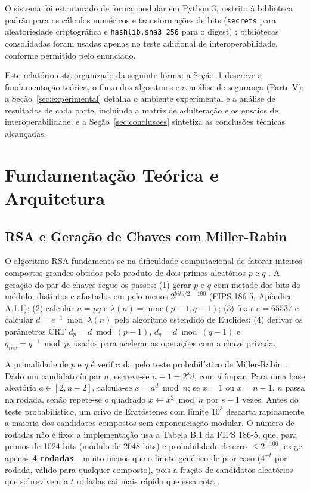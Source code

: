 \documentclass[conference]{IEEEtran}
\begin{document}
O sistema foi estruturado de forma modular em Python 3, restrito à
biblioteca padrão para os cálculos numéricos e transformações de bits
(\texttt{secrets} para aleatoriedade criptográfica e
\texttt{hashlib.sha3\_256} para o digest) \cite{fips202}; bibliotecas
consolidadas foram usadas apenas no teste adicional de interoperabilidade,
conforme permitido pelo enunciado.

Este relatório está organizado da seguinte forma: a
Seção~\ref{sec:fundamentacao} descreve a fundamentação teórica, o fluxo dos
algoritmos e a análise de segurança (Parte V); a
Seção~\ref{sec:experimental} detalha o ambiente experimental e a análise de
resultados de cada parte, incluindo a matriz de adulteração e os ensaios de
interoperabilidade; e a Seção~\ref{sec:conclusoes} sintetiza as conclusões
técnicas alcançadas.

\section{Fundamentação Teórica e Arquitetura}
\label{sec:fundamentacao}

\subsection{RSA e Geração de Chaves com Miller-Rabin}

O algoritmo RSA fundamenta-se na dificuldade computacional de fatorar
inteiros compostos grandes obtidos pelo produto de dois primos aleatórios
$p$ e $q$ \cite{sp80056b}. A geração do par de chaves segue os passos: (1)
gerar $p$ e $q$ com metade dos bits do módulo, distintos e afastados em
pelo menos $2^{bits/2 - 100}$ (FIPS 186-5, Apêndice A.1.1); (2) calcular
$n = pq$ e $\lambda(n) = \mathrm{mmc}(p-1, q-1)$; (3) fixar $e = 65537$ e
calcular $d = e^{-1} \bmod \lambda(n)$ pelo algoritmo estendido de Euclides;
(4) derivar os parâmetros CRT $d_p = d \bmod (p-1)$, $d_q = d \bmod (q-1)$
e $q_{inv} = q^{-1} \bmod p$, usados para acelerar as operações com a
chave privada.

A primalidade de $p$ e $q$ é verificada pelo teste probabilístico de
Miller-Rabin \cite{fips1865}. Dado um candidato ímpar $n$, escreve-se
$n - 1 = 2^s d$, com $d$ ímpar. Para uma base aleatória
$a \in [2, n-2]$, calcula-se $x = a^d \bmod n$; se $x = 1$ ou $x = n-1$,
$n$ passa na rodada, senão repete-se o quadrado $x \leftarrow x^2 \bmod n$
por $s-1$ vezes. Antes do teste probabilístico, um crivo de Eratóstenes com
limite $10^3$ descarta rapidamente a maioria dos candidatos compostos sem
exponenciação modular. O número de rodadas não é fixo: a implementação usa
a Tabela B.1 da FIPS 186-5, que, para primos de 1024 bits (módulo de 2048
bits) e probabilidade de erro $\le 2^{-100}$, exige apenas
\textbf{4 rodadas} -- muito menos que o limite genérico de pior caso
($4^{-t}$ por rodada, válido para qualquer composto), pois a fração de
candidatos aleatórios que sobrevivem a $t$ rodadas cai mais rápido que essa
cota \cite{dlp93}.
\end{document}
